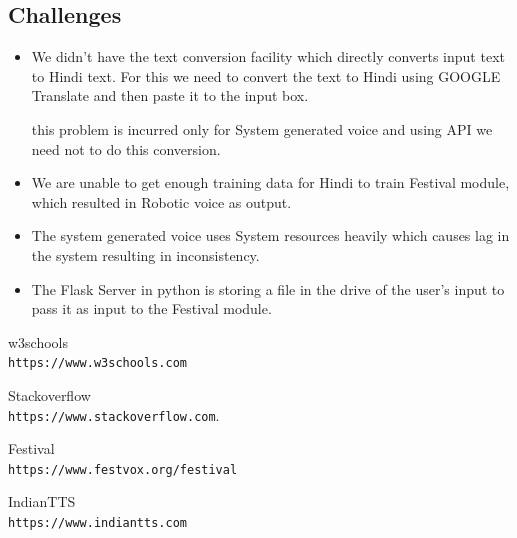 \documentclass{article}
\begin{document}
\subsection{Challenges}
\begin{itemize}
    \item \large We didn't have the text conversion facility which directly converts input text to Hindi text. For this we need to convert the text to Hindi using GOOGLE Translate and then paste it to the input box.\par
    this problem is incurred only for System generated voice and using API we need not to do this conversion.

    \item \large We are unable to get enough training data for Hindi to train Festival module, which resulted in Robotic voice as output.
    
    \item \large The system generated voice uses System resources heavily which causes lag in the system resulting in inconsistency.
    
    \item \large The Flask Server in python is storing a file in the drive of the user's input to pass it as input to the Festival module.
\end{itemize}



\begin{thebibliography}{9}
w3schools
\\\texttt{https://www.w3schools.com}
 
Stackoverflow
\\\texttt{https://www.stackoverflow.com}. 

Festival
\\\texttt{https://www.festvox.org/festival}

IndianTTS
\\\texttt{https://www.indiantts.com}

\end{thebibliography}
\end{document}
